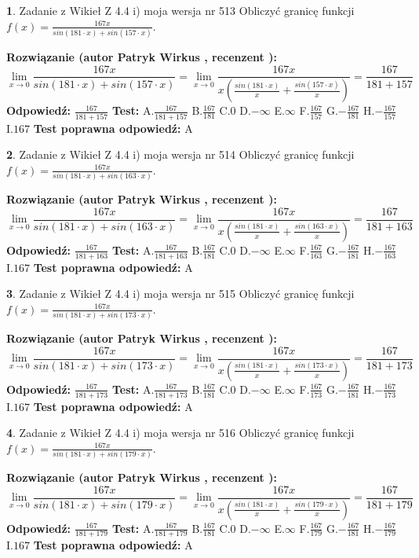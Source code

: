 \documentclass[12pt, a4paper]{article}
\theoremstyle{definition} %
\newtheorem{zad}{}
\newcommand{\zadStart}[1]{\begin{zad}#1\newline}
\newcommand{\zadStop}{\end{zad}}
\newcommand{\rozwStart}[2]{\noindent \textbf{Rozwiązanie (autor #1 , recenzent #2): }\newline}
\newcommand{\rozwStop}{\newline}
\newcommand{\odpStart}{\noindent \textbf{Odpowiedź:}\newline}
\newcommand{\odpStop}{\newline}
\newcommand{\testStart}{\noindent \textbf{Test:}\newline}
\newcommand{\testStop}{\newline}
\newcommand{\kluczStart}{\noindent \textbf{Test poprawna odpowiedź:}\newline}
\newcommand{\kluczStop}{\newline}
\begin{document}
\zadStart{Zadanie z Wikieł Z 4.4 i) moja wersja nr 513}
Obliczyć granicę funkcji $f(x)=\frac{167x}{sin(181\cdot x) +sin(157\cdot x)}$.
\zadStop
\rozwStart{Patryk Wirkus}{}
$$\lim\limits_{x\to 0}\frac{167x}{sin(181\cdot x) +sin(157\cdot x)}=\lim\limits_{x\to 0}\frac{167x}{x(\frac{sin(181\cdot x)}{x}+\frac{sin(157\cdot x)}{x})}=\frac{167}{181+157}$$
\rozwStop
\odpStart
$\frac{167}{181+157}$
\odpStop
\testStart
A.$\frac{167}{181+157}$
B.$\frac{167}{181}$
C.$0$
D.$-\infty$
E.$\infty$
F.$\frac{167}{157}$
G.$-\frac{167}{181}$
H.$-\frac{167}{157}$
I.$167$
\testStop
\kluczStart
A
\kluczStop



\zadStart{Zadanie z Wikieł Z 4.4 i) moja wersja nr 514}
Obliczyć granicę funkcji $f(x)=\frac{167x}{sin(181\cdot x) +sin(163\cdot x)}$.
\zadStop
\rozwStart{Patryk Wirkus}{}
$$\lim\limits_{x\to 0}\frac{167x}{sin(181\cdot x) +sin(163\cdot x)}=\lim\limits_{x\to 0}\frac{167x}{x(\frac{sin(181\cdot x)}{x}+\frac{sin(163\cdot x)}{x})}=\frac{167}{181+163}$$
\rozwStop
\odpStart
$\frac{167}{181+163}$
\odpStop
\testStart
A.$\frac{167}{181+163}$
B.$\frac{167}{181}$
C.$0$
D.$-\infty$
E.$\infty$
F.$\frac{167}{163}$
G.$-\frac{167}{181}$
H.$-\frac{167}{163}$
I.$167$
\testStop
\kluczStart
A
\kluczStop



\zadStart{Zadanie z Wikieł Z 4.4 i) moja wersja nr 515}
Obliczyć granicę funkcji $f(x)=\frac{167x}{sin(181\cdot x) +sin(173\cdot x)}$.
\zadStop
\rozwStart{Patryk Wirkus}{}
$$\lim\limits_{x\to 0}\frac{167x}{sin(181\cdot x) +sin(173\cdot x)}=\lim\limits_{x\to 0}\frac{167x}{x(\frac{sin(181\cdot x)}{x}+\frac{sin(173\cdot x)}{x})}=\frac{167}{181+173}$$
\rozwStop
\odpStart
$\frac{167}{181+173}$
\odpStop
\testStart
A.$\frac{167}{181+173}$
B.$\frac{167}{181}$
C.$0$
D.$-\infty$
E.$\infty$
F.$\frac{167}{173}$
G.$-\frac{167}{181}$
H.$-\frac{167}{173}$
I.$167$
\testStop
\kluczStart
A
\kluczStop



\zadStart{Zadanie z Wikieł Z 4.4 i) moja wersja nr 516}
Obliczyć granicę funkcji $f(x)=\frac{167x}{sin(181\cdot x) +sin(179\cdot x)}$.
\zadStop
\rozwStart{Patryk Wirkus}{}
$$\lim\limits_{x\to 0}\frac{167x}{sin(181\cdot x) +sin(179\cdot x)}=\lim\limits_{x\to 0}\frac{167x}{x(\frac{sin(181\cdot x)}{x}+\frac{sin(179\cdot x)}{x})}=\frac{167}{181+179}$$
\rozwStop
\odpStart
$\frac{167}{181+179}$
\odpStop
\testStart
A.$\frac{167}{181+179}$
B.$\frac{167}{181}$
C.$0$
D.$-\infty$
E.$\infty$
F.$\frac{167}{179}$
G.$-\frac{167}{181}$
H.$-\frac{167}{179}$
I.$167$
\testStop
\kluczStart
A
\kluczStop
\end{document}
